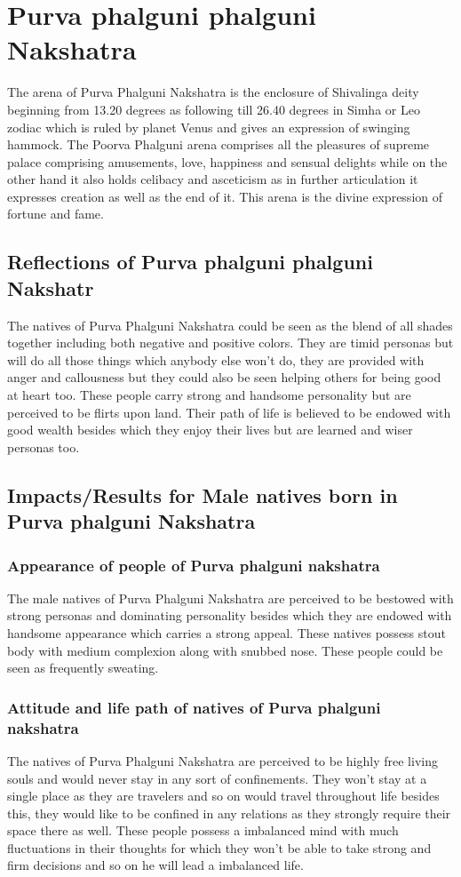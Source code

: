 \documentclass[12pt, right open]{memoir}
\begin{document}
\section{Purva phalguni phalguni Nakshatra}
The arena of Purva Phalguni Nakshatra is the enclosure of Shivalinga deity beginning from 13.20 degrees as following till 26.40 degrees in Simha or Leo zodiac which is ruled by planet Venus and gives an expression of swinging hammock. The Poorva Phalguni arena comprises all the pleasures of supreme palace comprising amusements, love, happiness and sensual delights while on the other hand it also holds celibacy and asceticism as in further articulation it expresses creation as well as the end of it. This arena is the divine expression of fortune and fame.

\subsection{Reflections of Purva phalguni phalguni Nakshatr}

The natives of Purva Phalguni Nakshatra could be seen as the blend of all shades together including both negative and positive colors. They are timid personas but will do all those things which anybody else won’t do, they are provided with anger and callousness but they could also be seen helping others for being good at heart too. These people carry strong and handsome personality but are perceived to be flirts upon land. Their path of life is believed to be endowed with good wealth besides which they enjoy their lives but are learned and wiser personas too.

\subsection{Impacts/Results for Male natives born in Purva phalguni Nakshatra}

\subsubsection{Appearance of people of Purva phalguni nakshatra}
The male natives of Purva Phalguni Nakshatra are perceived to be bestowed with strong personas and dominating personality besides which they are endowed with handsome appearance which carries a strong appeal. These natives possess stout body with medium complexion along with snubbed nose. These people could be seen as frequently sweating.
 	 	
\subsubsection{Attitude and life path of natives of Purva phalguni nakshatra}
The natives of Purva Phalguni Nakshatra are perceived to be highly free living souls and would never stay in any sort of confinements. They won’t stay at a single place as they are travelers and so on would travel throughout life besides this, they would like to be confined in any relations as they strongly require their space there as well. These people possess a imbalanced mind with much fluctuations in their thoughts for which they won’t be able to take strong and firm decisions and so on he will lead a imbalanced life.
\end{document}
